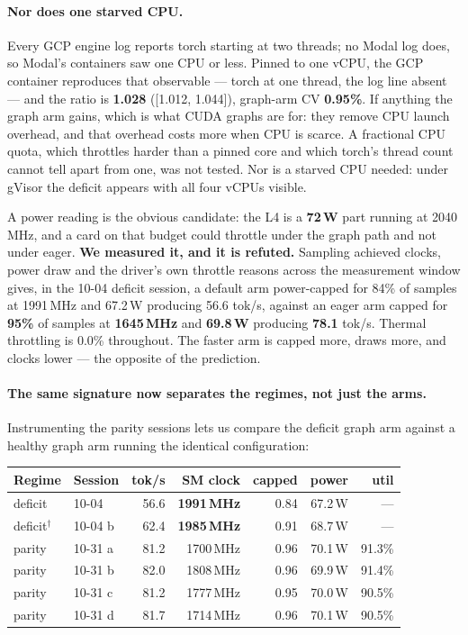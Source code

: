 \documentclass[11pt]{article}
\begin{document}
\paragraph{Nor does one starved CPU.} Every GCP engine log reports torch
starting at two threads; no Modal log does, so Modal's containers saw one
CPU or less. Pinned to one vCPU, the GCP container reproduces that
observable --- torch at one thread, the log line absent --- and the ratio is
\textbf{1.028} ([1.012, 1.044]), graph-arm CV \textbf{0.95\%}. If anything the
graph arm gains, which is what CUDA graphs are for: they remove CPU launch
overhead, and that overhead costs more when CPU is scarce. A fractional CPU
quota, which throttles harder than a pinned core and which torch's thread
count cannot tell apart from one, was not tested. Nor is a starved CPU
needed: under gVisor the deficit appears with all four vCPUs visible.

A power reading is the obvious candidate: the L4 is a \textbf{72\,W} part
running at 2040\,MHz, and a card on that budget could throttle under the
graph path and not under eager. \textbf{We measured it, and it is refuted.}
Sampling achieved clocks, power draw and the driver's own throttle reasons
across the measurement window gives, in the 10-04 deficit session, a default
arm power-capped for 84\% of samples at 1991\,MHz and 67.2\,W producing
56.6 tok/s, against an eager arm capped for \textbf{95\%} of samples at
\textbf{1645\,MHz} and \textbf{69.8\,W} producing \textbf{78.1} tok/s.
Thermal throttling is 0.0\% throughout. The faster arm is capped more, draws
more, and clocks lower --- the opposite of the prediction.

\paragraph{The same signature now separates the regimes, not just the arms.}
Instrumenting the parity sessions lets us compare the deficit graph arm
against a healthy graph arm running the identical configuration:

\begin{center}\small
\begin{tabular}{llrrrrr}
\toprule
Regime & Session & tok/s & SM clock & capped & power & util\\
\midrule
deficit & 10-04 & 56.6 & \textbf{1991\,MHz} & 0.84 & 67.2\,W & ---\\
deficit$^\dagger$ & 10-04 b & 62.4 & \textbf{1985\,MHz} & 0.91 & 68.7\,W & ---\\
\addlinespace
parity & 10-31 a & 81.2 & 1700\,MHz & 0.96 & 70.1\,W & 91.3\%\\
parity & 10-31 b & 82.0 & 1808\,MHz & 0.96 & 69.9\,W & 91.4\%\\
parity & 10-31 c & 81.2 & 1777\,MHz & 0.95 & 70.0\,W & 90.5\%\\
parity & 10-31 d & 81.7 & 1714\,MHz & 0.96 & 70.1\,W & 90.5\%\\
\bottomrule
\end{tabular}
\end{center}
\end{document}
